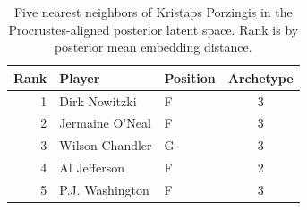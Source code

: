 \begin{table}[htbp]
  \centering\small
  \begin{tabular}{rllc}
    \toprule
    Rank & Player & Position & Archetype \\
    \midrule
    1 & Dirk Nowitzki & F & 3 \\
    2 & Jermaine O'Neal & F & 3 \\
    3 & Wilson Chandler & G & 3 \\
    4 & Al Jefferson & F & 2 \\
    5 & P.J. Washington & F & 3 \\
    \bottomrule
  \end{tabular}
  \caption{Five nearest neighbors of Kristaps Porzingis in the Procrustes-aligned posterior latent space. Rank is by posterior mean embedding distance.}
  \label{tab:Kristaps_Porzingis_neighbors}
\end{table}

